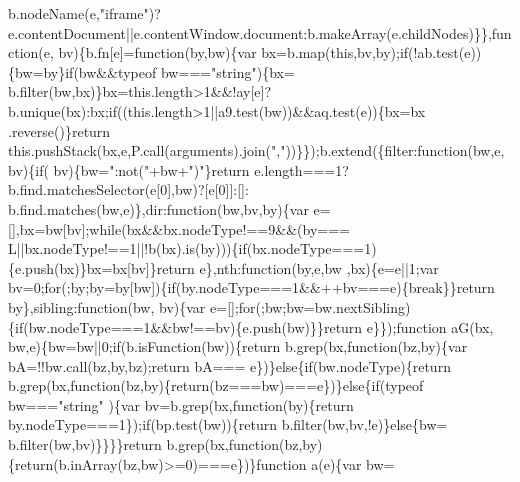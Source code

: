 \begin{DoxyCode}
{      b.nodeName(e,\textcolor{stringliteral}{"iframe"})?e.contentDocument||e.contentWindow.document:b.makeArray(e.childNodes)\}\},\textcolor{keyword}{function}(e,
      bv)\{b.fn[e]=\textcolor{keyword}{function}(by,bw)\{var bx=b.map(\textcolor{keyword}{this},bv,by);\textcolor{keywordflow}{if}(!ab.test(e))\{bw=by\}\textcolor{keywordflow}{if}(bw&&typeof bw===\textcolor{stringliteral}{"string"})\{bx=
      b.filter(bw,bx)\}bx=this.length>1&&!ay[e]?b.unique(bx):bx;\textcolor{keywordflow}{if}((this.length>1||a9.test(bw))&&aq.test(e))\{bx=bx
      .reverse()\}\textcolor{keywordflow}{return} this.pushStack(bx,e,P.call(arguments).join(\textcolor{stringliteral}{","}))\}\});b.extend(\{filter:\textcolor{keyword}{function}(bw,e,bv)\{\textcolor{keywordflow}{if}(
      bv)\{bw=\textcolor{stringliteral}{":not("}+bw+\textcolor{stringliteral}{")"}\}\textcolor{keywordflow}{return} e.length===1?b.find.matchesSelector(e[0],bw)?[e[0]]:[]:
      b.find.matches(bw,e)\},dir:\textcolor{keyword}{function}(bw,bv,by)\{var e=[],bx=bw[bv];\textcolor{keywordflow}{while}(bx&&bx.nodeType!==9&&(by===
      L||bx.nodeType!==1||!b(bx).is(by)))\{\textcolor{keywordflow}{if}(bx.nodeType===1)\{e.push(bx)\}bx=bx[bv]\}\textcolor{keywordflow}{return} e\},nth:\textcolor{keyword}{function}(by,e,bw
      ,bx)\{e=e||1;var bv=0;\textcolor{keywordflow}{for}(;by;by=by[bw])\{\textcolor{keywordflow}{if}(by.nodeType===1&&++bv===e)\{\textcolor{keywordflow}{break}\}\}\textcolor{keywordflow}{return} by\},sibling:\textcolor{keyword}{function}(bw,
      bv)\{var e=[];\textcolor{keywordflow}{for}(;bw;bw=bw.nextSibling)\{\textcolor{keywordflow}{if}(bw.nodeType===1&&bw!==bv)\{e.push(bw)\}\}\textcolor{keywordflow}{return} e\}\});\textcolor{keyword}{function} aG(bx,
      bw,e)\{bw=bw||0;\textcolor{keywordflow}{if}(b.isFunction(bw))\{\textcolor{keywordflow}{return} b.grep(bx,\textcolor{keyword}{function}(bz,by)\{var bA=!!bw.call(bz,by,bz);\textcolor{keywordflow}{return} bA===
      e\})\}\textcolor{keywordflow}{else}\{\textcolor{keywordflow}{if}(bw.nodeType)\{\textcolor{keywordflow}{return} b.grep(bx,\textcolor{keyword}{function}(bz,by)\{\textcolor{keywordflow}{return}(bz===bw)===e\})\}\textcolor{keywordflow}{else}\{\textcolor{keywordflow}{if}(typeof bw===\textcolor{stringliteral}{"string"}
      )\{var bv=b.grep(bx,\textcolor{keyword}{function}(by)\{\textcolor{keywordflow}{return} by.nodeType===1\});\textcolor{keywordflow}{if}(bp.test(bw))\{\textcolor{keywordflow}{return} b.filter(bw,bv,!e)\}\textcolor{keywordflow}{else}\{bw=
      b.filter(bw,bv)\}\}\}\}\textcolor{keywordflow}{return} b.grep(bx,\textcolor{keyword}{function}(bz,by)\{\textcolor{keywordflow}{return}(b.inArray(bz,bw)>=0)===e\})\}\textcolor{keyword}{function} a(e)\{var bw=
}
\end{DoxyCode}
